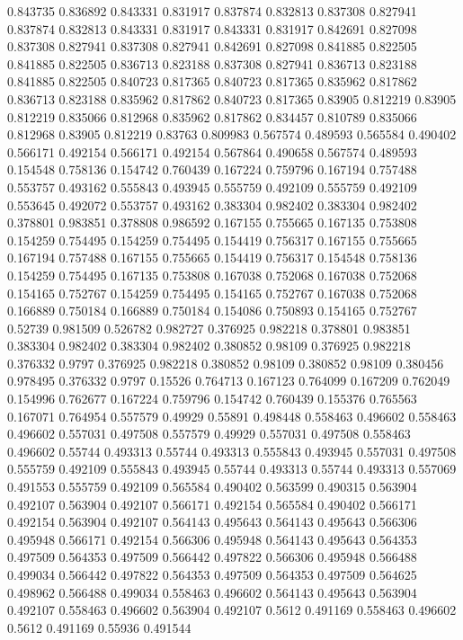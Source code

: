 0.843735 0.836892
0.843331 0.831917
0.837874 0.832813
0.837308 0.827941
0.837874 0.832813
0.843331 0.831917
0.843331 0.831917
0.842691 0.827098
0.837308 0.827941
0.837308 0.827941
0.842691 0.827098
0.841885 0.822505
0.841885 0.822505
0.836713 0.823188
0.837308 0.827941
0.836713 0.823188
0.841885 0.822505
0.840723 0.817365
0.840723 0.817365
0.835962 0.817862
0.836713 0.823188
0.835962 0.817862
0.840723 0.817365
0.83905 0.812219
0.83905 0.812219
0.835066 0.812968
0.835962 0.817862
0.834457 0.810789
0.835066 0.812968
0.83905 0.812219
0.83763 0.809983
0.567574 0.489593
0.565584 0.490402
0.566171 0.492154
0.566171 0.492154
0.567864 0.490658
0.567574 0.489593
0.154548 0.758136
0.154742 0.760439
0.167224 0.759796
0.167194 0.757488
0.553757 0.493162
0.555843 0.493945
0.555759 0.492109
0.555759 0.492109
0.553645 0.492072
0.553757 0.493162
0.383304 0.982402
0.383304 0.982402
0.378801 0.983851
0.378808 0.986592
0.167155 0.755665
0.167135 0.753808
0.154259 0.754495
0.154259 0.754495
0.154419 0.756317
0.167155 0.755665
0.167194 0.757488
0.167155 0.755665
0.154419 0.756317
0.154548 0.758136
0.154259 0.754495
0.167135 0.753808
0.167038 0.752068
0.167038 0.752068
0.154165 0.752767
0.154259 0.754495
0.154165 0.752767
0.167038 0.752068
0.166889 0.750184
0.166889 0.750184
0.154086 0.750893
0.154165 0.752767
0.52739 0.981509
0.526782 0.982727
0.376925 0.982218
0.378801 0.983851
0.383304 0.982402
0.383304 0.982402
0.380852 0.98109
0.376925 0.982218
0.376332 0.9797
0.376925 0.982218
0.380852 0.98109
0.380852 0.98109
0.380456 0.978495
0.376332 0.9797
0.15526 0.764713
0.167123 0.764099
0.167209 0.762049
0.154996 0.762677
0.167224 0.759796
0.154742 0.760439
0.155376 0.765563
0.167071 0.764954
0.557579 0.49929
0.55891 0.498448
0.558463 0.496602
0.558463 0.496602
0.557031 0.497508
0.557579 0.49929
0.557031 0.497508
0.558463 0.496602
0.55744 0.493313
0.55744 0.493313
0.555843 0.493945
0.557031 0.497508
0.555759 0.492109
0.555843 0.493945
0.55744 0.493313
0.55744 0.493313
0.557069 0.491553
0.555759 0.492109
0.565584 0.490402
0.563599 0.490315
0.563904 0.492107
0.563904 0.492107
0.566171 0.492154
0.565584 0.490402
0.566171 0.492154
0.563904 0.492107
0.564143 0.495643
0.564143 0.495643
0.566306 0.495948
0.566171 0.492154
0.566306 0.495948
0.564143 0.495643
0.564353 0.497509
0.564353 0.497509
0.566442 0.497822
0.566306 0.495948
0.566488 0.499034
0.566442 0.497822
0.564353 0.497509
0.564353 0.497509
0.564625 0.498962
0.566488 0.499034
0.558463 0.496602
0.564143 0.495643
0.563904 0.492107
0.558463 0.496602
0.563904 0.492107
0.5612 0.491169
0.558463 0.496602
0.5612 0.491169
0.55936 0.491544
